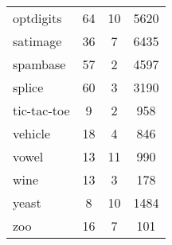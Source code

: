 \begin{table}[H]
\begin{tabular}{@{}lccc@{}}
optdigits         & 64                  & 10               & 5620                 \\
satimage          & 36                  & 7                & 6435                 \\
spambase          & 57                  & 2                & 4597                 \\
splice            & 60                  & 3                & 3190                 \\
tic-tac-toe       & 9                   & 2                & 958                  \\
vehicle           & 18                  & 4                & 846                  \\
vowel             & 13                  & 11               & 990                  \\
wine              & 13                  & 3                & 178                  \\
yeast             & 8                   & 10               & 1484                 \\
zoo               & 16                  & 7                & 101                  \\ \bottomrule
\end{tabular}
\end{table}
